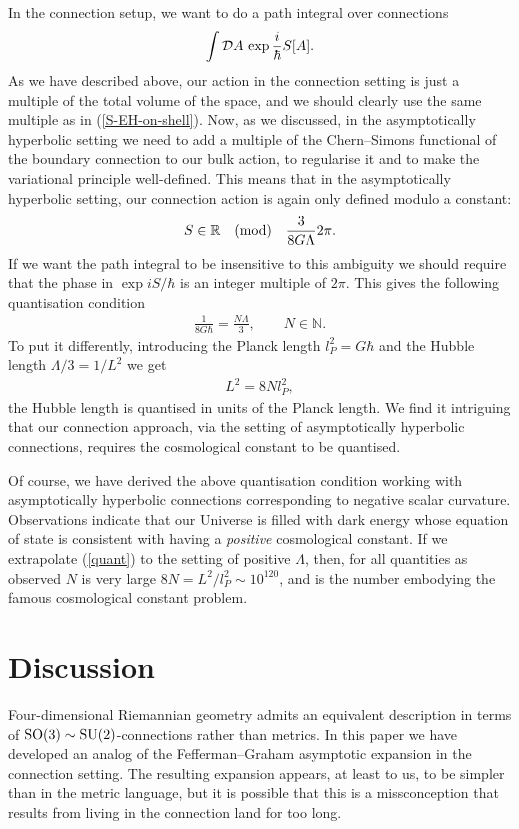 \documentclass[a4paper,12pt]{article}
\newcommand{\be}{\begin{eqnarray}}
\newcommand{\ee}{\end{eqnarray}}
\begin{document}
In the connection setup, we want to do a path integral over connections 
\be
\int {\cal D}A \, \exp{\frac{i}{\hbar} S[A]}.
\ee
As we have described above, our action in the connection setting is just a multiple of the total volume of the space, and we should clearly use the same multiple as in (\ref{S-EH-on-shell}). Now, as we discussed, in the asymptotically hyperbolic setting we need to add a multiple of the Chern--Simons functional of the boundary connection to our bulk action, to regularise it and to make the variational principle well-defined. This means that in the asymptotically hyperbolic setting, our connection action is again only defined modulo a constant:
\be
S  \in \mathbb{R} \quad {\rm (mod)} \quad \frac{3}{8 G \Lambda} 2\pi.
\ee
If we want the path integral to be insensitive to this ambiguity we should require that the phase in $\exp{i S/\hbar}$ is an integer multiple of $2\pi$. This gives the following quantisation condition
\be
\frac{1}{8 G \hbar} = \frac{N\Lambda}{3}, \qquad N\in {\mathbb N}.
\ee
To put it differently, introducing the Planck length $l_P^2 = G\hbar$ and the Hubble length $\Lambda/3=1/L^2$ we get
\be\label{quant}
L^2 = 8 N l_P^2,
\ee
the Hubble length is quantised in units of the Planck length. We find it intriguing that our connection approach, via the setting of asymptotically hyperbolic connections, requires the cosmological constant to be quantised. 

Of course, we have derived the above quantisation condition working with asymptotically hyperbolic connections corresponding to negative scalar curvature. Observations indicate that our Universe is filled with dark energy whose equation of state is consistent with having a {\it positive} cosmological constant. If we extrapolate (\ref{quant}) to the setting of positive $\Lambda$, then, for all quantities as observed $N$ is very large $8N = L^2/l_P^2 \sim 10^{120}$, and is the number embodying the famous cosmological constant problem. 

\section{Discussion}

Four-dimensional Riemannian geometry admits an equivalent description in terms of ${\rm SO}(3)\sim{\rm SU}(2)$-connections rather than metrics. In this paper we have developed an analog of the Fefferman--Graham asymptotic expansion in the connection setting. The resulting expansion appears, at least to us, to be simpler than in the metric language, but it is possible that this is a missconception that results from living in the connection land for too long. 
\end{document}
